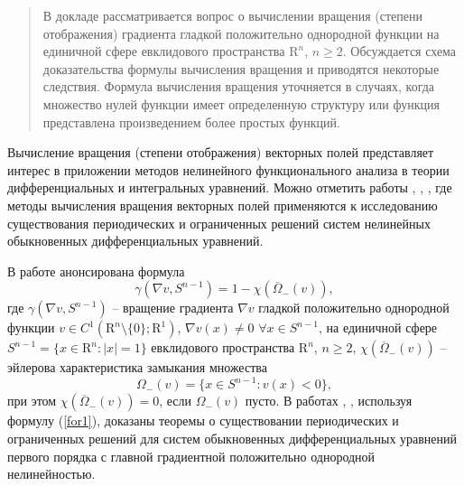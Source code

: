 
\maketitle

\begin{abstract}
В докладе рассматривается вопрос о вычислении вращения (степени отображения) градиента гладкой положительно однородной функции на единичной сфере евклидового  пространства $\mathrm{R}^n$, $n\geq 2$. 
Обсуждается схема доказательства формулы вычисления вращения и приводятся некоторые следствия.
Формула вычисления вращения уточняется в случаях, когда множество нулей функции имеет определенную структуру или
 функция представлена произведением более простых функций.
 
\end{abstract}


Вычисление вращения (степени отображения) векторных полей представляет интерес в приложении методов нелинейного функционального анализа 
в теории дифференциальных и интегральных уравнений. Можно отметить работы \cite{K66},  \cite{KZ75}, \cite{M96}, где методы вычисления 
вращения векторных полей применяются к исследованию существования 
периодических и ограниченных решений систем нелинейных 
обыкновенных дифференциальных уравнений. 

В работе \cite{M96} анонсирована формула 
\begin{equation}\label{for1}
\gamma(\nabla v, S^{n-1})=1-\chi (\overline{\Omega}_-(v)),
\end{equation}
где $\gamma(\nabla v, S^{n-1})$ -- вращение градиента $\nabla v$
гладкой положительно однородной функции 
$v\in C^1(\mathrm{R}^n\setminus\{0\};\mathrm{R}^1)$, 
$\nabla v(x)\neq 0$ $\forall x\in S^{n-1}$, 
на единичной сфере $S^{n-1}=\{x\in \mathrm{R}^n : |x|=1 \}$ 
евклидового пространства $\mathrm{R}^n$, $n\geq 2$,
 $\chi (\overline{\Omega}_-(v))$ -- эйлерова характеристика
замыкания множества
$$
\Omega_-(v)=\{x\in S^{n-1} : v(x)<0 \},
$$ 
при этом $\chi (\overline{\Omega}_-(v))=0$, если 
$\Omega_-(v)$ пусто. В работах \cite{MN21}, \cite{MN22},  используя формулу (\ref{for1}),  доказаны теоремы о существовании периодических и ограниченных  решений для систем обыкновенных дифференциальных уравнений первого порядка с главной градиентной положительно однородной нелинейностью.

